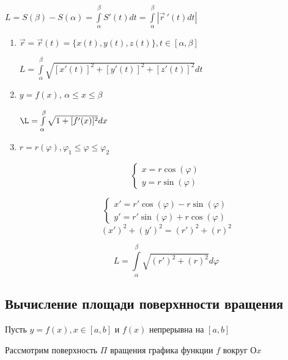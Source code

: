 \documentclass[a4paper,12pt]{article} %
\begin{document}
$L=S(\beta)-S(\alpha)=\int\limits_\alpha^\beta S'(t)dt = \int\limits_\alpha^\beta |\Vec{r}\,'(t) dt|$

\begin{enumerate}
    \item $\Vec{r}=\Vec{r}(t)=\{ x(t), y(t), z(t) \}, t\in [\alpha, \beta]$
    
    $L = \int\limits_\alpha^\beta \sqrt{[x'(t)]^2+[y'(t)]^2+[z'(t)]^2}dt$
    
    \item $y=f(x)$, $\alpha \leq x \leq \beta$
    
    $\L=\int\limits_\alpha^\beta \sqrt{1+[f'(x)]^2}dx$
    
    \item $r=r(\varphi), \varphi_1 \leq \varphi \leq \varphi_2$
    
    \begin{equation*}
 \begin{cases}
  x=r \cos(\varphi)
   \\
   y = r \sin(\varphi)
   
 \end{cases}
\end{equation*}

 \begin{equation*}
 \begin{cases}
  x'=r' \cos(\varphi) - r\sin(\varphi)
   \\
   y' = r' \sin(\varphi) + r\cos(\varphi)
   
 \end{cases}
\end{equation*}
\begin{equation}
  (x')^2+(y')^2=(r')^2+(r)^2  
\end{equation}

\begin{equation}
  L =\int\limits_\alpha^\beta \sqrt{(r')^2+(r)^2}d\varphi 
\end{equation}

\end{enumerate}

\subsection*{Вычисление площади поверхнности вращения}

Пусть $y=f(x), x \in [a, b]$ и $f(x)$ непрерывна на $[a, b]$

Рассмотрим поверхность $\Pi$ вращения графика функции $f$ вокруг $Оx$
\end{document}
